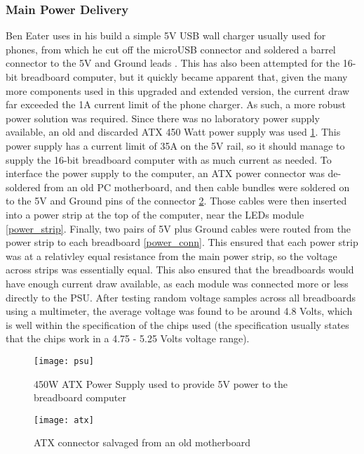 \subsubsection{Main Power Delivery}
Ben Eater uses in his build a simple 5V USB wall charger usually used for phones, from which he
cut off the microUSB connector and soldered a barrel connector to the 5V and Ground leads
\cite{eater2020power}. This has also been attempted for the 16-bit breadboard computer, but it
quickly became apparent that, given the many more components used in this upgraded and extended
version,  the current draw far exceeded the 1A current limit of the phone charger. As such, a more
robust power solution was required. Since there was no laboratory power supply available, an old
and discarded ATX 450 Watt power supply was used \ref{psu}. This power supply has a current limit
of 35A on the 5V rail, so it should manage to supply the 16-bit breadboard computer with as much
current as needed. To interface the power supply to the computer, an ATX power connector was de-
soldered from an old PC motherboard, and then cable bundles were soldered on to the 5V and Ground
pins of the connector \ref{atx}. Those cables were then inserted into a power strip at the top of
the computer, near the LEDs module \ref{power_strip}. Finally, two pairs of 5V plus Ground cables
were routed from the power strip to each breadboard \ref{power_conn}. This ensured that each
power strip was at a relativley equal resistance from the main power strip, so the voltage across
strips was essentially equal. This also ensured that the breadboards would have enough current
draw available, as each module was connected more or less directly to the PSU. After testing
random voltage samples across all breadboards using a multimeter, the average voltage was found
to be around 4.8 Volts, which is well within the specification of the chips used (the
specification usually states that the chips work in a 4.75 - 5.25 Volts voltage range).

\begin{figure}[ht]
  \centering
  \texttt{[image: psu]}
  \caption{450W ATX Power Supply used to provide 5V power to the breadboard computer }
  \label{psu}
\end{figure}

\begin{figure}[ht]
  \centering
  \texttt{[image: atx]}
  \caption{ATX connector salvaged from an old motherboard}
  \label{atx}
\end{figure}

